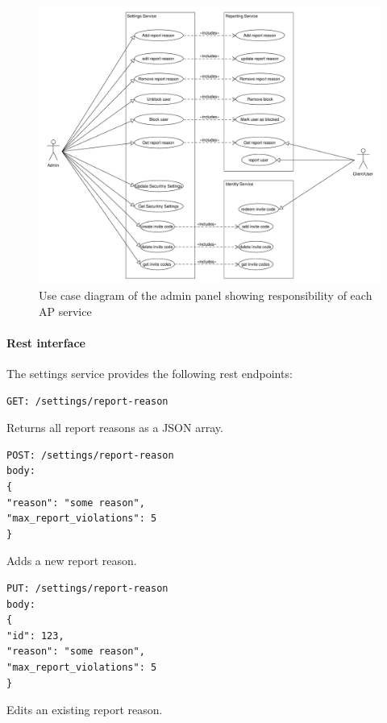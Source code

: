 \begin{figure}[!ht]
    \centering
    \includegraphics[width=1.0\textwidth]{./images/UseCaseDiagramAdminPanel}
    \caption{Use case diagram of the admin panel showing responsibility of each AP service}
    \label{fig:ucd}
\end{figure}

\paragraph{Rest interface}

The settings service provides the following \ac{rest} endpoints:

\begin{lstlisting}
GET: /settings/report-reason
\end{lstlisting}

Returns all report reasons as a JSON array.

\begin{lstlisting}
POST: /settings/report-reason
body:
{
"reason": "some reason",
"max_report_violations": 5
}
\end{lstlisting}

Adds a new report reason.

\begin{lstlisting}
PUT: /settings/report-reason
body:
{
"id": 123,
"reason": "some reason",
"max_report_violations": 5
}
\end{lstlisting}

Edits an existing report reason.

